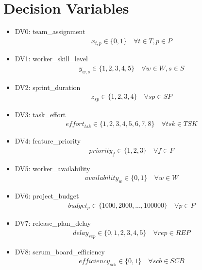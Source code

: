 \documentclass{article}
\begin{document}
\section{Decision Variables}
\begin{itemize}
    \item DV0: team\_assignment
        \begin{align*}
            x_{t, p} \in \{0, 1\} \quad \forall t \in T, p \in P
        \end{align*}
    \item DV1: worker\_skill\_level
        \begin{align*}
            y_{w, s} \in \{1, 2, 3, 4, 5\} \quad \forall w \in W, s \in S
        \end{align*}
    \item DV2: sprint\_duration
        \begin{align*}
            z_{sp} \in \{1, 2, 3, 4\} \quad \forall sp \in SP
        \end{align*}
    \item DV3: task\_effort
        \begin{align*}
            effort_{tsk} \in \{1, 2, 3, 4, 5, 6, 7, 8\} \quad \forall tsk \in TSK
        \end{align*}
    \item DV4: feature\_priority
        \begin{align*}
            priority_{f} \in \{1, 2, 3\} \quad \forall f \in F
        \end{align*}
    \item DV5: worker\_availability
        \begin{align*}
            availability_{w} \in \{0, 1\} \quad \forall w \in W
        \end{align*}
    \item DV6: project\_budget
        \begin{align*}
            budget_{p} \in \{1000, 2000, ..., 100000\} \quad \forall p \in P
        \end{align*}
    \item DV7: release\_plan\_delay
        \begin{align*}
            delay_{rep} \in \{0, 1, 2, 3, 4, 5\} \quad \forall rep \in REP
        \end{align*}
    \item DV8: scrum\_board\_efficiency
        \begin{align*}
            efficiency_{scb} \in \{0, 1\} \quad \forall scb \in SCB
        \end{align*}

\end{itemize}
\end{document}
